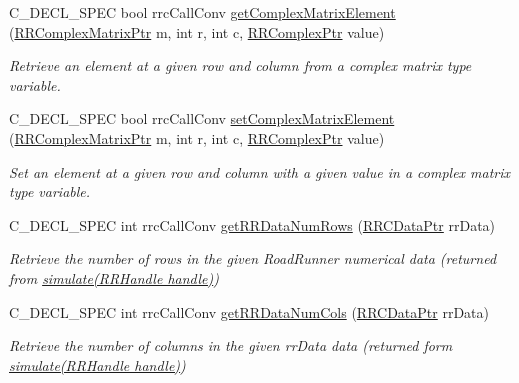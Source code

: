 \begin{DoxyCompactItemize}
C\+\_\+\+D\+E\+C\+L\+\_\+\+S\+P\+E\+C bool rrc\+Call\+Conv \hyperlink{group__helper_routines_gaac303b0adb267fb6cbc244106299546e}{get\+Complex\+Matrix\+Element} (\hyperlink{rrc__types_8h_a8cf9e865d8541d100f153800adbb7c3f}{R\+R\+Complex\+Matrix\+Ptr} m, int r, int c, \hyperlink{rrc__types_8h_ada2046d7326c56ae29d8510fbf6622ee}{R\+R\+Complex\+Ptr} value)
\begin{DoxyCompactList}\small\item\em Retrieve an element at a given row and column from a complex matrix type variable. \end{DoxyCompactList}\item 
C\+\_\+\+D\+E\+C\+L\+\_\+\+S\+P\+E\+C bool rrc\+Call\+Conv \hyperlink{group__helper_routines_ga4c1503693a172a994c6d685be5dcda70}{set\+Complex\+Matrix\+Element} (\hyperlink{rrc__types_8h_a8cf9e865d8541d100f153800adbb7c3f}{R\+R\+Complex\+Matrix\+Ptr} m, int r, int c, \hyperlink{rrc__types_8h_ada2046d7326c56ae29d8510fbf6622ee}{R\+R\+Complex\+Ptr} value)
\begin{DoxyCompactList}\small\item\em Set an element at a given row and column with a given value in a complex matrix type variable. \end{DoxyCompactList}\item 
C\+\_\+\+D\+E\+C\+L\+\_\+\+S\+P\+E\+C int rrc\+Call\+Conv \hyperlink{group__helper_routines_gae18768d9447fda2618cacb5099eb768e}{get\+R\+R\+Data\+Num\+Rows} (\hyperlink{rrc__types_8h_a9da8b124eb9c3c0045f8926c6a420b4a}{R\+R\+C\+Data\+Ptr} rr\+Data)
\begin{DoxyCompactList}\small\item\em Retrieve the number of rows in the given Road\+Runner numerical data (returned from \hyperlink{group__simulation_ga9ac99f6909eb0a6244035fc9cdeff94d}{simulate(\+R\+R\+Handle handle)}) \end{DoxyCompactList}\item 
C\+\_\+\+D\+E\+C\+L\+\_\+\+S\+P\+E\+C int rrc\+Call\+Conv \hyperlink{group__helper_routines_ga76a2e0f7b1704b28ef0b6661b5e6ada9}{get\+R\+R\+Data\+Num\+Cols} (\hyperlink{rrc__types_8h_a9da8b124eb9c3c0045f8926c6a420b4a}{R\+R\+C\+Data\+Ptr} rr\+Data)
\begin{DoxyCompactList}\small\item\em Retrieve the number of columns in the given rr\+Data data (returned form \hyperlink{group__simulation_ga9ac99f6909eb0a6244035fc9cdeff94d}{simulate(\+R\+R\+Handle handle)}) \end{DoxyCompactList}\item 

\end{DoxyCompactItemize}
